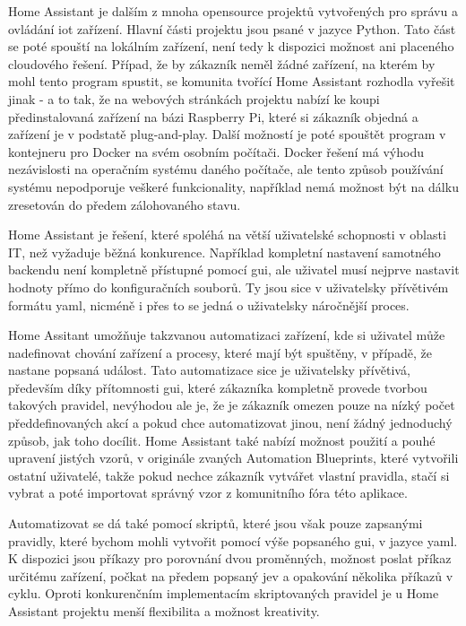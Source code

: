 Home Assistant je dalším z mnoha opensource projektů vytvořených pro správu a ovládání \acrshort{iot} zařízení. Hlavní části projektu jsou psané v jazyce Python. Tato část se poté spouští na lokálním zařízení, není tedy k dispozici možnost ani placeného cloudového řešení. Případ, že by zákazník neměl žádné zařízení, na kterém by mohl tento program spustit, se komunita tvořící Home Assistant rozhodla vyřešit jinak - a to tak, že na webových stránkách projektu nabízí ke koupi předinstalovaná zařízení na bázi Raspberry Pi, které si zákazník objedná a zařízení je v podstatě plug-and-play. Další možností je poté spouštět program v kontejneru pro Docker na svém osobním počítači. Docker řešení má výhodu nezávislosti na operačním systému daného počítače, ale tento způsob používání systému nepodporuje veškeré funkcionality, například nemá možnost být na dálku zresetován do předem zálohovaného stavu.

Home Assistant je řešení, které spoléhá na větší uživatelské schopnosti v oblasti IT, než vyžaduje běžná konkurence. Například kompletní nastavení samotného backendu není kompletně přístupné pomocí \acrshort{gui}, ale uživatel musí nejprve nastavit hodnoty přímo do konfiguračních souborů. Ty jsou sice v uživatelsky přívětivém formátu \acrshort{yaml}, nicméně i přes to se jedná o uživatelsky náročnější proces. 

Home Assitant umožňuje takzvanou automatizaci zařízení, kde si uživatel může nadefinovat chování zařízení a procesy, které mají být spuštěny, v případě, že nastane popsaná událost. Tato automatizace sice je uživatelsky přívětivá, především díky přítomnosti \acrshort{gui}, které zákazníka kompletně provede tvorbou takových pravidel, nevýhodou ale je, že je zákazník omezen pouze na nízký počet předdefinovaných akcí a 
pokud chce automatizovat jinou, není žádný jednoduchý způsob, jak toho docílit. Home Assistant také nabízí možnost použití a pouhé upravení jistých vzorů, v originále zvaných Automation Blueprints, které vytvořili ostatní uživatelé, takže pokud nechce zákazník vytvářet vlastní pravidla, stačí si vybrat a poté importovat správný vzor z komunitního fóra této aplikace.

Automatizovat se dá také pomocí skriptů, které jsou však pouze zapsanými pravidly, které bychom mohli vytvořit pomocí výše popsaného \acrshort{gui}, v jazyce \acrshort{yaml}. K dispozici jsou příkazy pro porovnání dvou proměnných, možnost poslat příkaz určitému zařízení, počkat na předem popsaný jev a opakování několika příkazů v cyklu. Oproti konkurenčním implementacím skriptovaných pravidel je u Home Assistant projektu menší flexibilita a možnost kreativity.


